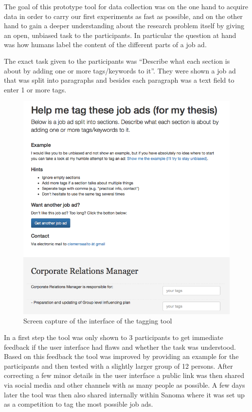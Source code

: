 The goal of this prototype tool for data collection was on the one hand to acquire data in order to carry our first experiments as fast as possible, and on the other hand to gain a deeper understanding about the research problem itself by giving an open, unbiased task to the participants. In particular the question at hand was how humans label the content of the different parts of a job ad.

The exact task given to the participants was ``Describe what each section is about by adding one or more tags/keywords to it''. They were shown a job ad that was split into paragraphs and besides each paragraph was a text field to enter 1 or more tags.

\begin{figure}[h]
  \centering
  \includegraphics[width=\textwidth]{img/thesis-tagger-interface.png}
  \caption{Screen capture of the interface of the tagging tool}
\label{fig:thesis-tagger-interface}
\end{figure}

In a first step the tool was only shown to 3 participants to get immediate feedback if the user interface had flaws and whether the task was understood.   Based on this feedback the tool was improved by providing an example for the participants and then tested with a slightly larger group of 12 persons. After correcting a few minor details in the user interface a public link was then shared via social media and other channels with as many people as possible. A few days later the tool was then also shared internally within Sanoma where it was set up as a competition to tag the most possible job ads.

